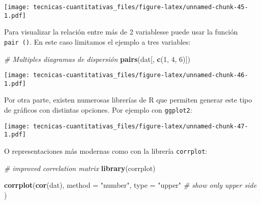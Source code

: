 \documentclass[
]{book}
\newenvironment{Shaded}{\begin{snugshade}}{\end{snugshade}}
\newcommand{\CommentTok}[1]{\textcolor[rgb]{0.56,0.35,0.01}{\textit{#1}}}
\newcommand{\DataTypeTok}[1]{\textcolor[rgb]{0.13,0.29,0.53}{#1}}
\newcommand{\DecValTok}[1]{\textcolor[rgb]{0.00,0.00,0.81}{#1}}
\newcommand{\KeywordTok}[1]{\textcolor[rgb]{0.13,0.29,0.53}{\textbf{#1}}}
\newcommand{\NormalTok}[1]{#1}
\newcommand{\OperatorTok}[1]{\textcolor[rgb]{0.81,0.36,0.00}{\textbf{#1}}}
\newcommand{\StringTok}[1]{\textcolor[rgb]{0.31,0.60,0.02}{#1}}
\begin{document}
\texttt{[image: tecnicas-cuantitativas\_files/figure-latex/unnamed-chunk-45-1.pdf]}

Para visualizar la relación entre más de 2 variablesse puede usar la función \texttt{pair\ ()}. En este caso limitamos el ejemplo a tres variables:

\begin{Shaded}
\begin{Highlighting}[]
\CommentTok{# Multiples diagramas de dispersión}
\KeywordTok{pairs}\NormalTok{(dat[, }\KeywordTok{c}\NormalTok{(}\DecValTok{1}\NormalTok{, }\DecValTok{4}\NormalTok{, }\DecValTok{6}\NormalTok{)])}
\end{Highlighting}
\end{Shaded}

\texttt{[image: tecnicas-cuantitativas\_files/figure-latex/unnamed-chunk-46-1.pdf]}

Por otra parte, existen numerosas librerías de R que permiten generar este tipo de gráficos con distintas opciones. Por ejemplo con \texttt{ggplot2}:

\begin{Shaded}
\end{Shaded}

\texttt{[image: tecnicas-cuantitativas\_files/figure-latex/unnamed-chunk-47-1.pdf]}

O representaciones más modernas como con la librería \texttt{corrplot}:

\begin{Shaded}
\begin{Highlighting}[]
\CommentTok{# improved correlation matrix}
\KeywordTok{library}\NormalTok{(corrplot)}

\KeywordTok{corrplot}\NormalTok{(}\KeywordTok{cor}\NormalTok{(dat),}
         \DataTypeTok{method =} \StringTok{"number"}\NormalTok{,}
         \DataTypeTok{type =} \StringTok{"upper"} \CommentTok{# show only upper side}
\NormalTok{         )}
\end{Highlighting}
\end{Shaded}
\end{document}

